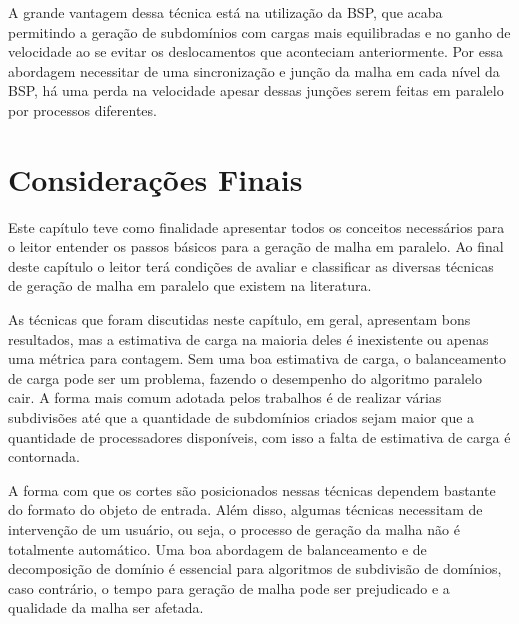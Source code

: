     
    A grande vantagem dessa técnica está na utilização da BSP, que acaba permitindo a geração de subdomínios com cargas mais equilibradas e no ganho de velocidade ao se evitar os deslocamentos que aconteciam anteriormente. Por essa abordagem necessitar de uma sincronização e junção da malha em cada nível da BSP, há uma perda na velocidade apesar dessas junções serem feitas em paralelo por processos diferentes.
    
    
    
    \section{Considerações Finais}
    
    
    Este capítulo teve como finalidade apresentar todos os conceitos necessários para o leitor entender os passos básicos para a geração de malha em paralelo. Ao final deste capítulo o leitor terá condições de avaliar e classificar as diversas técnicas de geração de malha em paralelo que existem na literatura.
    
    As técnicas que foram discutidas neste capítulo, em geral, apresentam bons resultados, mas a estimativa de carga na maioria deles é inexistente ou apenas uma métrica para contagem. Sem uma boa estimativa de carga, o balanceamento de carga pode ser um problema, fazendo o desempenho do algoritmo paralelo cair. A forma mais comum adotada pelos trabalhos é de realizar várias subdivisões até que a quantidade de subdomínios criados sejam maior que a quantidade de processadores disponíveis, com isso a falta de estimativa de carga é contornada.
    
    A forma com que os cortes são posicionados nessas técnicas dependem bastante do formato do objeto de entrada. Além disso, algumas técnicas necessitam de intervenção de um usuário, ou seja, o processo de geração da malha não é totalmente automático. Uma boa abordagem de balanceamento e de decomposição de domínio é essencial para algoritmos de subdivisão de domínios, caso contrário, o tempo para geração de malha pode ser prejudicado e a qualidade da malha ser afetada.